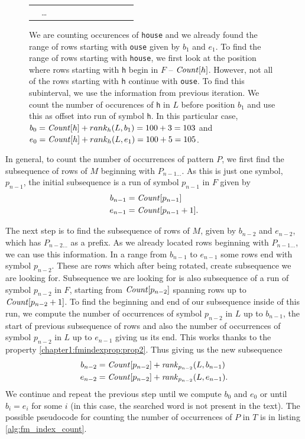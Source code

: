 \begin{figure}
{\begin{tabular}{c|c|l|l|l|l|l|l|l|l|l|l|}
	                & \ldots     &   &  &   &   &   &   &   &   &   &   \\ \cline{5-10}\cline{2-3}\cline{12-12}
	\end{tabular}
	}
	\caption[TODO]{We are counting occurences of \texttt{house} and we already found the
	range of rows starting with \texttt{ouse} given by $b_1$ and $e_1$. To find the range of rows starting
	with \texttt{house}, we first look at the position where rows starting with \texttt{h} begin in $F$ -- $\mathit{Count}[h]$.
	However, not all of the rows starting with \texttt{h} continue with \texttt{ouse}. To find this subinterval,
	we use the information from previous iteration. We count the number of occurences of \texttt{h} in $L$ before
	position $b_1$ and use this as offset into run of symbol \texttt{h}. In this particular case,
	$b_0 = \mathit{Count}[h] + rank_h(L, b_1) = 100 + 3 = 103$ and
	$e_0 = \mathit{Count}[h] + rank_h(L, e_1) = 100 + 5 = 105$.
	}
	\label{tab:fm_index_example}
\end{figure}

In general, to count the number of occurrences of pattern $P$, we first find the subsequence of rows of $M$
beginning with $P_{n-1\ldots}$. As this is just one symbol, $p_{n-1}$, the initial subsequence is a run
of symbol $p_{n-1}$ in $F$ given by
\begin{align*}
	b_{n-1}&=\mathit{Count}[p_{n-1}] \\
	e_{n-1}&=\mathit{Count}[p_{n-1}+1].\\
\end{align*}

The next step is to find the subsequence of rows of $M$, given by $b_{n-2}$ and $e_{n-2}$, which has
$P_{n-2\ldots}$ as a prefix. As we already located rows beginning with $P_{n-1\ldots}$, we can use
this information. In a range from $b_{n-1}$ to $e_{n-1}$ some rows end with symbol $p_{n-2}$. These
are rows which after being rotated, create subsequence we are looking for. Subsequence we are looking
for is also subsequence of a run of symbol $p_{n-2}$ in $F$, starting from $\mathit{Count}[p_{n-2}]$ spanning
rows up to $\mathit{Count}[p_{n-2}+1]$. To find the beginning and end of our subsequence inside of this run, we
compute the number of occurrences of symbol $p_{n-2}$ in $L$ up to $b_{n-1}$, the start of previous
subsequence of rows and also the number of occurrences of symbol $p_{n-2}$ in $L$ up to $e_{n-1}$
giving us its end. This works thanks to the property \ref{chapter1:fmindexprop:prop2}. Thus giving us the
new subsequence
\begin{align*}
	b_{n-2}&=\mathit{Count}[p_{n-2}] + \mathit{rank}_{p_{n-2}}(L, b_{n-1}) \\
	e_{n-2}&=\mathit{Count}[p_{n-2}] + \mathit{rank}_{p_{n-2}}(L, e_{n-1}).\\
\end{align*}
We continue and repeat the previous step until we compute $b_0$ and $e_0$ or until $b_i=e_i$ for some $i$
(in this case, the searched word is not present in the text). The possible pseudocode for counting the number
of occurrences of $P$ in $T$ is in listing \ref{alg:fm_index_count}.

